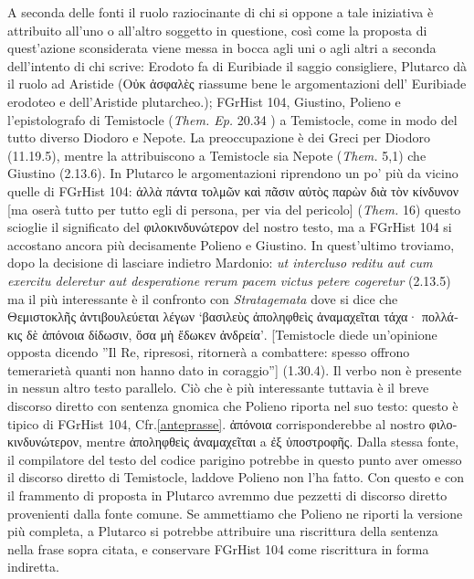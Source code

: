 {    A seconda delle fonti il ruolo raziocinante di chi si oppone a tale iniziativa è attribuito all'uno o all'altro soggetto in questione, così come la proposta di quest'azione sconsiderata viene messa in bocca agli uni o agli altri a seconda dell'intento di chi scrive: Erodoto fa di  Euribiade  il saggio consigliere, Plutarco dà il ruolo ad Aristide (\textgreek{Οὐκ ἀσφαλὲς} riassume bene le argomentazioni dell' Euribiade  erodoteo e dell'Aristide plutarcheo.); FGrHist 104, Giustino, Polieno e l'epistolografo di Temistocle (\emph{Them. Ep.}  20.34 ) a Temistocle, come in modo del tutto diverso  Diodoro e Nepote. La preoccupazione è dei Greci per  Diodoro (11.19.5), mentre la attribuiscono a Temistocle sia  Nepote (\emph{Them.}   5,1) che  Giustino (2.13.6). In Plutarco le argomentazioni riprendono un po' più da vicino quelle di FGrHist 104: \textgreek{ἀλλὰ πάντα τολμῶν καὶ πᾶσιν αὐτὸς παρὼν διὰ τὸν κίνδυνον}  [ma oserà tutto per tutto egli di persona, per via del pericolo]  (\emph{Them.}  16) questo scioglie il significato del \textgreek{φιλοκινδυνώτερον} del nostro testo, ma a FGrHist 104 si accostano ancora più decisamente Polieno e Giustino. In quest'ultimo troviamo, dopo la decisione di lasciare indietro Mardonio: \emph{ut intercluso reditu aut cum exercitu deleretur aut desperatione rerum pacem victus petere cogeretur} (2.13.5) ma il più interessante è il confronto con \emph{Stratagemata} dove si dice che \textgreek{Θεμιστοκλῆς ἀντιβουλεύεται λέγων ‘βασιλεὺς ἀποληφθεὶς ἀναμαχεῖται τάχα· πολλάκις δὲ ἀπόνοια δίδωσιν, ὅσα μὴ ἔδωκεν ἀνδρεία’}. [Temistocle diede un'opinione opposta dicendo ''Il Re, ripresosi, ritornerà a combattere: spesso offrono  temerarietà quanti non hanno dato in coraggio''] (1.30.4). Il verbo non è presente in nessun altro testo parallelo. Ciò che è più interessante tuttavia è il breve discorso diretto con sentenza gnomica che Polieno riporta nel suo testo: questo è tipico di FGrHist 104, Cfr.\ref{anteprasse}. \textgreek{ἀπόνοια} corrisponderebbe al nostro \textgreek{φιλοκινδυνώτερον}, mentre \textgreek{ἀποληφθεὶς ἀναμαχεῖται} a \textgreek{ἐξ ὑποστροφῆς}. Dalla stessa fonte, il compilatore del testo del codice parigino potrebbe in questo punto aver omesso il discorso diretto di Temistocle, laddove Polieno non l'ha fatto. Con questo e con il frammento di proposta in Plutarco avremmo due pezzetti di discorso diretto provenienti dalla fonte comune. Se ammettiamo che Polieno ne riporti la versione più completa, a Plutarco si potrebbe attribuire una riscrittura della sentenza nella frase sopra citata, e conservare FGrHist 104 come riscrittura in forma indiretta. 
}
